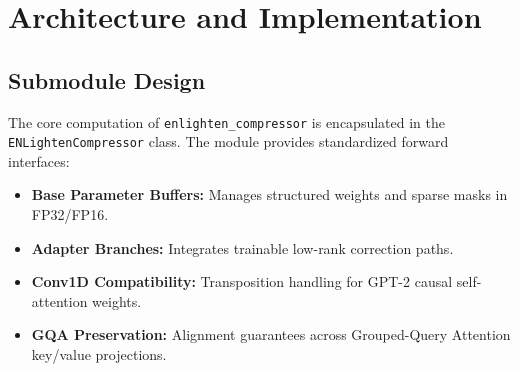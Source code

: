 \section{Architecture and Implementation}

\subsection{Submodule Design}
The core computation of \texttt{enlighten_compressor} is encapsulated in the \texttt{ENLightenCompressor} class. The module provides standardized forward interfaces:
\begin{itemize}
\item \textbf{Base Parameter Buffers:} Manages structured weights and sparse masks in FP32/FP16.
\item \textbf{Adapter Branches:} Integrates trainable low-rank correction paths.
\item \textbf{Conv1D Compatibility:} Transposition handling for GPT-2 causal self-attention weights.
\item \textbf{GQA Preservation:} Alignment guarantees across Grouped-Query Attention key/value projections.
\end{itemize}
